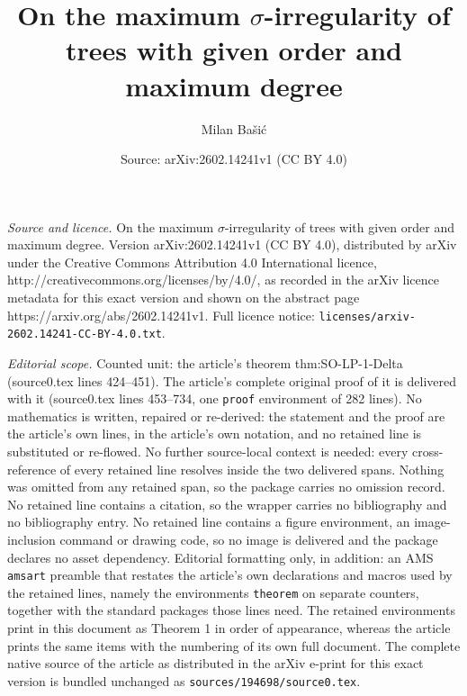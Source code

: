 \documentclass[10pt,a4paper]{amsart}
\title{On the maximum $\sigma$-irregularity of trees with given order and maximum degree}
\author{Milan Ba\v{s}i\'c}
\date{Source: arXiv:2602.14241v1 (CC BY 4.0)}
\begin{document}
\maketitle

\noindent\emph{Source and licence.} On the maximum $\sigma$-irregularity of trees with given order and maximum degree. Version arXiv:2602.14241v1 (CC BY 4.0), distributed by arXiv under the Creative Commons Attribution 4.0 International licence, http://creativecommons.org/licenses/by/4.0/, as recorded in the arXiv licence metadata for this exact version and shown on the abstract page https://arxiv.org/abs/2602.14241v1. Full licence notice: \texttt{licenses/arxiv-2602.14241-CC-BY-4.0.txt}.\par\smallskip

\noindent\textit{Editorial scope.} Counted unit: the article's theorem thm:SO-LP-1-Delta (source0.tex lines 424--451). The article's complete original proof of it is delivered with it (source0.tex lines 453--734, one \texttt{proof} environment of 282 lines). No mathematics is written, repaired or re-derived: the statement and the proof are the article's own lines, in the article's own notation, and no retained line is substituted or re-flowed.  No further source-local context is needed: every cross-reference of every retained line resolves inside the two delivered spans.  Nothing was omitted from any retained span, so the package carries no omission record.  No retained line contains a citation, so the wrapper carries no bibliography and no bibliography entry.  No retained line contains a figure environment, an image-inclusion command or drawing code, so no image is delivered and the package declares no asset dependency.  Editorial formatting only, in addition: an AMS \texttt{amsart} preamble that restates the article's own declarations and macros used by the retained lines, namely the environments \texttt{theorem} on separate counters, together with the standard packages those lines need.  The retained environments print in this document as Theorem 1 in order of appearance, whereas the article prints the same items with the numbering of its own full document.  The complete native source of the article as distributed in the arXiv e-print for this exact version is bundled unchanged as \texttt{sources/194698/source0.tex}.
\end{document}
